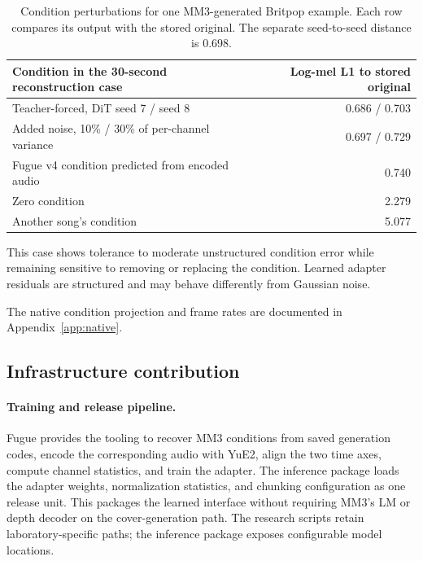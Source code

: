 \documentclass[11pt,a4paper]{article}
\begin{document}
\begin{table}[htbp]
    \centering
    \caption{Condition perturbations for one MM3-generated Britpop example. Each row compares its output with the stored original. The separate seed-to-seed distance is 0.698.}
    \label{tab:sensitivity}
    \small
    \begin{tabular}{lr}
        \toprule
        Condition in the 30-second reconstruction case & Log-mel L1 to stored original \\
        \midrule
        Teacher-forced, DiT seed 7 / seed 8 & 0.686 / 0.703 \\
        Added noise, 10\% / 30\% of per-channel variance & 0.697 / 0.729 \\
        Fugue v4 condition predicted from encoded audio & 0.740 \\
        Zero condition & 2.279 \\
        Another song's condition & 5.077 \\
        \bottomrule
    \end{tabular}
\end{table}

This case shows tolerance to moderate unstructured condition error while remaining sensitive to removing or replacing the condition. Learned adapter residuals are structured and may behave differently from Gaussian noise.

The native condition projection and frame rates are documented in Appendix~\ref{app:native}.

\subsection{Infrastructure contribution}
\label{sec:infra}

\paragraph{Training and release pipeline.} Fugue provides the tooling to recover MM3 conditions from saved generation codes, encode the corresponding audio with YuE2, align the two time axes, compute channel statistics, and train the adapter. The inference package loads the adapter weights, normalization statistics, and chunking configuration as one release unit. This packages the learned interface without requiring MM3's LM or depth decoder on the cover-generation path. The research scripts retain laboratory-specific paths; the inference package exposes configurable model locations.
\end{document}
